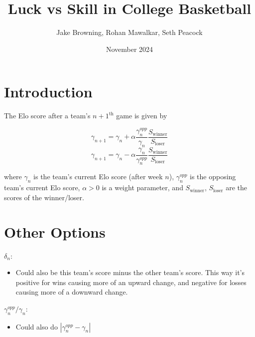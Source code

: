 \documentclass{article}
\title{Luck vs Skill in College Basketball}
\author{Jake Browning, Rohan Mawalkar, Seth Peacock}
\date{November 2024}
\begin{document}
\maketitle

\section{Introduction}

The Elo score after a team's $n+1^{\text{th}}$ game is given by

\[
\gamma_{n+1} = \gamma_n + \alpha\frac{\gamma^{opp}_n}{\gamma_n}\frac{S_{\text{winner}}}{S_{\text{loser}}}
\]
\[
\gamma_{n+1} = \gamma_n - \alpha\frac{\gamma_n}{\gamma^{opp}_n}\frac{S_{\text{winner}}}{S_{\text{loser}}}
\]

where $\gamma_n$ is the team's current Elo score (after week $n$), $\gamma^{opp}_n$ is the opposing team's current Elo score, $\alpha > 0$ is a weight parameter, and $S_{\text{winner}}$, $S_{\text{loser}}$ are the scores of the winner/loser.

\section{Other Options}

$\delta_n$:
\begin{itemize}
    \item Could also be this team's score minus the other team's score. This way it's positive for wins causing more of an upward change, and negative for losses causing more of a downward change.
\end{itemize}

$\gamma^{opp}_n/\gamma_n$:
\begin{itemize}
    \item Could also do $|\gamma^{opp}_n - \gamma_n|$
\end{itemize}


 
\end{document}
